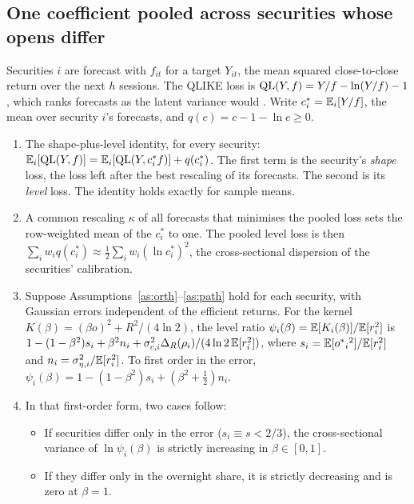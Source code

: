 \subsection{One coefficient pooled across securities whose opens differ}\label{sec:pooling}

Securities $i$ are forecast with $f_{it}$ for a target $Y_{it}$, the mean squared close-to-close
return over the next $h$ sessions. The QLIKE loss is
$\operatorname{QL}(Y,f)=Y/f-\ln(Y/f)-1$, which ranks forecasts as the latent variance would
\citep{Patton2011}. Write $c^*_i=\mathbb{E}_i[Y/f]$, the mean over security $i$'s forecasts, and
$q(c)=c-1-\ln c\ge0$.

\begin{proposition}[Pooling]\label{prop:pool}
\leavevmode
\begin{enumerate}[label=(\alph*)]
  \item The shape-plus-level identity, for every security:
        $\mathbb{E}_i[\operatorname{QL}(Y,f)]=\mathbb{E}_i[\operatorname{QL}(Y,c^*_if)]+q(c^*_i)$. The first term is the security's
        \emph{shape} loss, the loss left after the best rescaling of its forecasts. The second is
        its \emph{level} loss. The identity holds exactly for sample means.
  \item A common rescaling $\kappa$ of all forecasts that minimises the pooled loss sets the
        row-weighted mean of the $c^*_i$ to one. The pooled level loss is then
        $\sum_iw_iq(c^*_i)\approx\tfrac12\sum_iw_i(\ln c^*_i)^2$, the cross-sectional dispersion
        of the securities' calibration.
  \item Suppose Assumptions~\ref{as:orth}--\ref{as:path} hold for each security, with Gaussian
        errors independent of the efficient returns. For the kernel $K(\beta)=(\beta o)^2+R^2/(4\ln2)$, the level ratio
        $\psi_i(\beta)=\mathbb{E}[K_i(\beta)]/\mathbb{E}[r_i^2]$ is
        $1-(1-\beta^2)s_i+\beta^2n_i+\sigma_{c,i}^2\Delta_R(\rho_i)/(4\ln2\,\mathbb{E}[r_i^2])$, where
        $s_i=\mathbb{E}[{o^{*}}_i{}^2]/\mathbb{E}[r_i^2]$ and $n_i=\sigma_{\eta,i}^2/\mathbb{E}[r_i^2]$. To first order in the
        error, $\psi_i(\beta)=1-(1-\beta^2)s_i+(\beta^2+\tfrac12)n_i$.
  \item In that first-order form, two cases follow:
        \begin{itemize}
          \item If securities differ only in the error ($s_i\equiv s<2/3$), the cross-sectional
                variance of $\ln\psi_i(\beta)$ is strictly increasing in $\beta\in[0,1]$.
          \item If they differ only in the overnight share, it is strictly decreasing and is zero
                at $\beta=1$.
        \end{itemize}
\end{enumerate}
\end{proposition}

